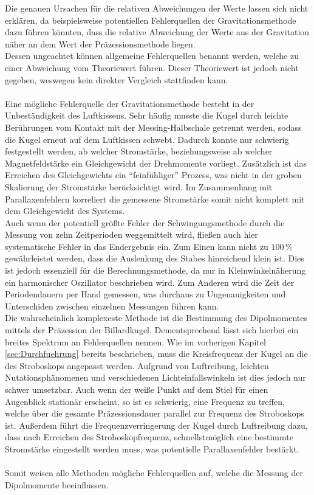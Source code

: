 \noindent Die genauen Ursachen für die relativen Abweichungen der Werte lassen sich nicht erklären, da beispielsweise 
potentiellen Fehlerquellen der Gravitationsmethode dazu führen könnten, dass die relative Abweichung der Werte aus der 
Gravitation näher an dem Wert der Präzessionsmethode liegen. \\
Dessen ungeachtet können allgemeine Fehlerquellen benannt werden, welche zu einer Abweichung vom Theoriewert führen. Dieser 
Theoriewert ist jedoch nicht gegeben, weswegen kein direkter Vergleich stattfinden kann.\\\\
Eine mögliche Fehlerquelle der Gravitationsmethode besteht in der Unbeständigkeit des Luftkissens. Sehr häufig musste 
die Kugel durch leichte Berührungen vom Kontakt mit der Messing-Halbschale getrennt werden, sodass die Kugel erneut 
auf dem Luftkissen schwebt. Dadurch konnte nur schwierig festgestellt werden, ab welcher Stromstärke, beziehungsweise ab 
welcher Magnetfeldstärke ein Gleichgewicht der Drehmomente vorliegt. Zusätzlich ist das Erreichen des Gleichgewichts 
ein \enquote{feinfühliger} Prozess, was nicht in der groben Skalierung der Stromstärke berücksichtigt wird. Im Zusammenhang 
mit Parallaxenfehlern korreliert die gemessene Stromstärke somit nicht komplett mit dem Gleichgewicht des Systems.\\
Auch wenn der potentiell größte Fehler der Schwingungsmethode durch die Messung von zehn Zeitperioden weggemittelt wird,
fließen auch hier systematische Fehler in das Endergebnis ein. Zum Einen kann nicht zu $100\,\unit{\percent}$ 
gewährleistet werden, dass die Auslenkung des Stabes hinreichend klein ist. Dies ist jedoch essenziell für die 
Berechnungsmethode, da nur in Kleinwinkelnäherung ein harmonischer Oszillator beschrieben wird. Zum Anderen wird die Zeit 
der Periodendauern per Hand gemessen, was durchaus zu Ungenauigkeiten und Unterschiden zwischen einzelnen Messungen 
führen kann. \\
Die wahrscheinlich komplexeste Methode ist die Bestimmung des Dipolmomentes mittels der Präzession der Billardkugel.
Dementsprechend lässt sich hierbei ein breites Spektrum an Fehlerquellen nennen. Wie im vorherigen Kapitel \ref{sec:Durchfuehrung}
bereits beschrieben, muss die Kreisfrequenz der Kugel an die des Stroboskops angepasst werden. Aufgrund von Luftreibung,
leichten Nutationsphänomenen und verschiedenen Lichteinfallswinkeln ist dies jedoch nur schwer umsetzbar. Auch wenn der weiße
Punkt auf dem Stiel für einen Augenblick stationär erscheint, so ist es schwierig, eine Frequenz zu treffen, welche über 
die gesamte Präzessionsdauer parallel zur Frequenz des Stroboskops ist. Außerdem führt die Frequenzverringerung der Kugel 
durch Luftreibung dazu, dass nach Erreichen des Stroboskopfrequenz, schnellstmöglich eine bestimmte Stromstärke eingestellt werden 
muss, was potentielle Parallaxenfehler bestärkt. \\\\
Somit weisen alle Methoden mögliche Fehlerquellen auf, welche die Messung der Dipolmomente beeinflussen.

